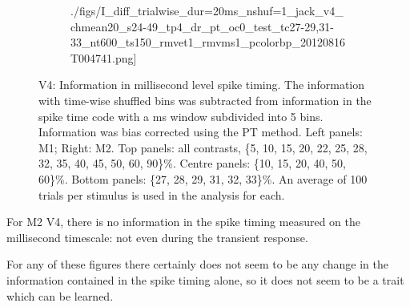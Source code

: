 \begin{figure}[htbp]
\begin{subfigure}[b]{0.5\linewidth}
{./figs/I\_diff\_trialwise\_dur=20ms\_nshuf=1\_jack\_v4\_chmean20\_s24-49\_tp4\_dr\_pt\_oc0\_test\_tc27-29,31-33\_nt600\_ts150\_rmvet1\_rmvms1\_pcolorbp\_20120816T004741.png]}
    \end{subfigure}
    \caption{\small{}V4: Information in millisecond level spike timing.
The information with time-wise shuffled bins was subtracted from information in the spike time code with a \unit[20]{ms} window subdivided into 5 bins.
Information was bias corrected using the PT method.
Left panels: M1; Right: M2.
Top panels: all contrasts, \{5, 10, 15, 20, 22, 25, 28, 32, 35, 40, 45, 50, 60, 90\}\%.
Centre panels: \{10, 15, 20, 40, 50, 60\}\%.
Bottom panels: \{27, 28, 29, 31, 32, 33\}\%.
An average of 100 trials per stimulus is used in the analysis for each.
}
    \label{fig:v4-dif}
\end{figure}


For M2 V4, there is no information in the spike timing measured on the millisecond timescale: not even during the transient response.

For any of these figures there certainly does not seem to be any change in the information contained in the spike timing alone, so it does not seem to be a trait which can be learned.

